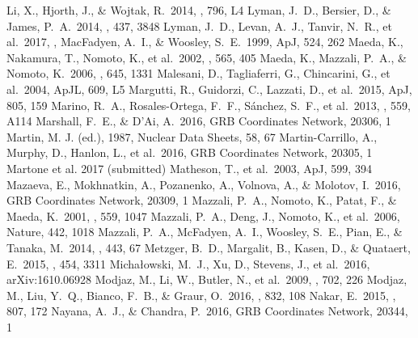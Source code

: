\documentclass[traditabstract,longauth]{aa}
\begin{document}
\begin{thebibliography}{99}
 Li, X., Hjorth, J., \& Wojtak, R.\ 2014, \apjl, 796, L4 
 Lyman, J.~D., Bersier, D., \& James, P.~A.\ 2014, \mnras, 437, 3848 
 Lyman, J.~D., Levan, A.~J., Tanvir, N.~R., et al.\ 2017, \mnras,  
 MacFadyen, A.~I., \& Woosley, S.~E.\ 1999, ApJ, 524, 262
 Maeda, K., Nakamura, T., Nomoto, K., et al.\ 2002, \apj, 565, 405 
 Maeda, K., Mazzali, P.~A., \& Nomoto, K.\ 2006, \apj, 645, 1331 
 Malesani, D., Tagliaferri, G., Chincarini, G., et al.\ 2004, ApJL, 609, L5 
 Margutti, R., Guidorzi, C., Lazzati, D., et al.\ 2015, ApJ, 805, 159 
 Marino, R.~A., Rosales-Ortega, F.~F., S{\'a}nchez, S.~F., et al.\ 2013, \aap, 559, A114 
 Marshall, F.~E., \& D'Ai, A.\ 2016, GRB Coordinates Network, 20306, 1 
  Martin, M. J. (ed.), 1987, Nuclear Data Sheets, 58, 67
 Martin-Carrillo, A., Murphy, D., Hanlon, L., et al.\ 2016, GRB Coordinates Network, 20305, 1 
 Martone et al. 2017 (submitted)
 Matheson, T., et al.\ 2003, ApJ, 599, 394
 Mazaeva, E., Mokhnatkin, A., Pozanenko, A., Volnova, A., \& Molotov, I.\ 2016, GRB Coordinates Network, 20309, 1 
 Mazzali, P.~A., Nomoto, K., Patat, F., \& Maeda, K.\ 2001, \apj, 559, 1047 
 Mazzali, P.~A., Deng, J., Nomoto, K., et al.\ 2006, Nature, 442, 1018 
 Mazzali, P.~A., McFadyen, A.~I., Woosley, S.~E., Pian, E., \& Tanaka, M.\ 2014, \mnras, 443, 67 
 Metzger, B.~D., Margalit, B., Kasen, D., \& Quataert, E.\ 2015, \mnras, 454, 3311 
 Micha{\l}owski, M.~J., Xu, D., Stevens, J., et al.\ 2016, arXiv:1610.06928 
 Modjaz, M., Li, W., Butler, N., et al.\ 2009, \apj, 702, 226 
 Modjaz, M., Liu, Y.~Q., Bianco, F.~B., \& Graur, O.\ 2016, \apj, 832, 108 
 Nakar, E.\ 2015, \apj, 807, 172 
 Nayana, A.~J., \& Chandra, P.\ 2016, GRB Coordinates Network, 20344, 1 

\end{thebibliography}
\end{document}
